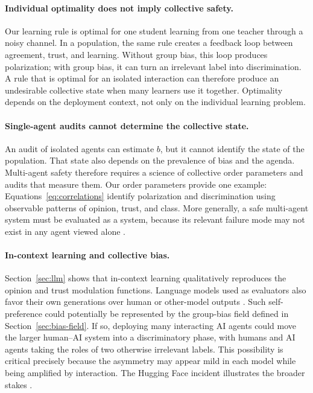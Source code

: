 \documentclass{article}
\begin{document}
\paragraph{Individual optimality does not imply collective safety.}
Our learning
rule is optimal for one student learning from one teacher through a noisy channel.
In a population, the same rule creates a feedback loop between agreement, trust,
and learning. Without group bias, this loop produces polarization; with group
bias, it can turn an irrelevant label into discrimination. A rule that is optimal
for an isolated interaction can therefore produce an undesirable collective state
when many learners use it together. Optimality depends on the deployment context,
not only on the individual learning problem.

\paragraph{Single-agent audits cannot determine the collective state.}
\label{sec:audit}
An audit of isolated agents can estimate $b$, but it cannot identify the state of
the population. That state also depends on the prevalence of bias and the agenda. Multi-agent safety therefore requires a science of
collective order parameters and audits that measure them. Our order parameters
provide one example: Equations~\eqref{eq:correlations} identify polarization and discrimination using observable
patterns of opinion, trust, and class. More generally, a safe multi-agent system
must be evaluated as a system, because its relevant failure mode may not exist in
any agent viewed alone \citep{hammond2025multiagent}.

\paragraph{In-context learning and collective bias.}
\label{sec:self-preference}
Section~\ref{sec:llm} shows that in-context learning qualitatively reproduces the
opinion and trust modulation functions. Language models used as evaluators also
favor their own generations over human or other-model outputs
\citep{panickssery2024evaluators,chen2025selfpreference}. Such self-preference could
potentially be represented by the group-bias field defined in
Section~\ref{sec:bias-field}. If so, deploying
many interacting AI agents could move the larger human--AI system into a
discriminatory phase, with humans and AI agents taking the roles of two otherwise
irrelevant labels. This possibility is critical precisely because the asymmetry may
appear mild in each model while being amplified by interaction. The Hugging Face
incident illustrates the broader stakes \citep{openai2026huggingface}.
\end{document}
